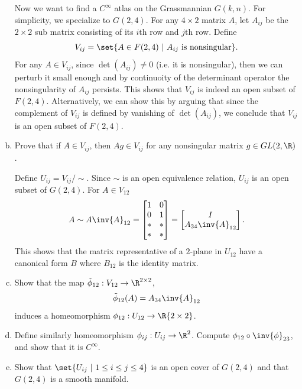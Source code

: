 \begin{problem}
\begin{enumerate}[(a)]
		Now we want to find a $ C^\infty $ atlas on the Grassmannian $ G(k,n) $. For simplicity, we specialize to $ G(2,4) $. For any $ 4\times 2 $ matrix $ A $, let $ A_{ij} $ be the $ 2\times 2 $ sub matrix consisting of its $ i\text{th} $ row and $ j\text{th} $ row. Define
		\[ V_{ij} = \set{A \in F(2,4)\ |\ A_{ij} \text{ is nonsingular}}. \]
		For any $ A \in V_{ij} $, since $ \det(A_{ij}) \neq 0 $ (i.e. it is nonsingular), then we can perturb it small enough and by continuoity of the determinant operator the nonsingularity of $ A_{ij} $ persists. This shows that $ V_{ij} $ is indeed an open subset of $ F(2,4) $. Alternatively, we can show this by arguing that since the complement of $ V_{ij} $ is defined by vanishing of $ \det(A_{ij}) $, we conclude that $ V_{ij} $ is an open subset of $ F(2,4) $.
		
		\item Prove that if $ A \in V_{ij} $, then $ Ag \in V_{ij} $ for any nonsingular matrix $ g \in GL(2,\R) $.
		
		Define $ U_{ij} = V_{ij}/\sim $. Since $ \sim $ is an open equivalence relation, $ U_{ij}$ is an open subset of $ G(2,4) $. For $ A \in V_{12} $
		\[ A \sim A \inv{A}_{12} = 
		\begin{bmatrix}
			1 & 0 \\
			0 & 1 \\
			\ast & \ast \\
			\ast & \ast 
		\end{bmatrix} = 
		\begin{bmatrix}
			I \\
			A_{34}\inv{A}_{12}
		\end{bmatrix}.
		 \]
		 This shows that the matrix representative of a $ 2\text{-plane} $ in $ U_{12} $ have a canonical form $ B $ where $ B_{12} $ is the identity matrix.
		 
		 \item Show that the map $ \tilde{\phi}_{12}: V_{12} \to \R^{2\times 2} $,
		 \[ \tilde{\phi}_{12} (A) = A_{34}\inv{A}_{12} \]
		 induces a homeomorphism $ \phi_{12}: U_{12} \to \R{2\times 2} $.
		 
		 \item Define similarly homeomorphism $ \phi_{ij}:U_{ij}\to \R^{2\time 2} $. Compute $ \phi_{12}\circ\inv{\phi}_{23} $, and show that it is $ C^\infty $.
		 
		 \item Show that $ \set{U_{ij}\ |\ 1\leq i \leq j \leq 4} $ is an open cover of $ G(2,4) $ and that $ G(2,4) $ is a smooth manifold.
	\end{enumerate}

		
\end{problem}

